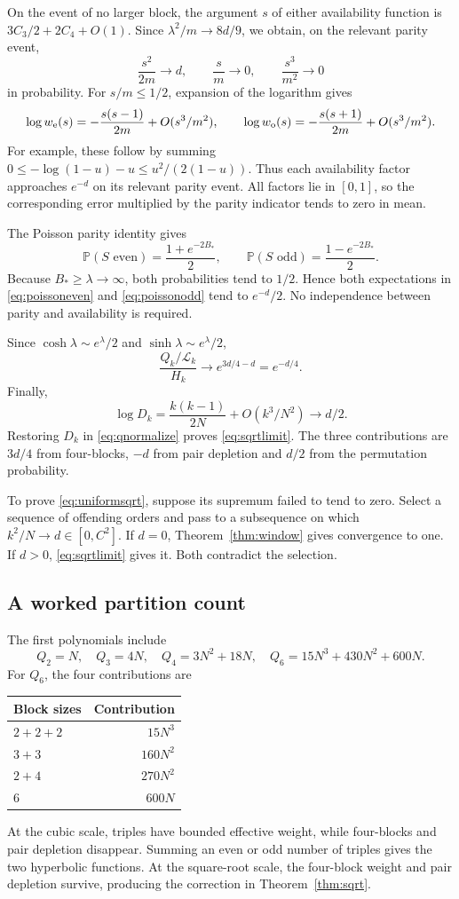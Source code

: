 \documentclass[11pt]{article}
\theoremstyle{definition}
\theoremstyle{remark}
\newcommand{\PP}{\mathbb P}
\newcommand{\1}{\mathbf 1}
\begin{document}
On the event of no larger block, the argument $s$ of either availability function is $3C_3/2+2C_4+O(1)$. Since $\lambda^2/m\to8d/9$, we obtain, on the relevant parity event,
\[
\frac{s^2}{2m}\to d,\qquad \frac sm\to0,\qquad \frac{s^3}{m^2}\to0
\]
in probability. For $s/m\le1/2$, expansion of the logarithm gives
\[
\log w_{\rm e}(s)=-\frac{s(s-1)}{2m}+O(s^3/m^2),\qquad
\log w_{\rm o}(s)=-\frac{s(s+1)}{2m}+O(s^3/m^2).
\]
For example, these follow by summing
$0\le-\log(1-u)-u\le u^2/(2(1-u))$.
Thus each availability factor approaches $e^{-d}$ on its relevant parity event. All factors lie in $[0,1]$, so the corresponding error multiplied by the parity indicator tends to zero in mean.

The Poisson parity identity gives
\[
\PP(S\text{ even})=\frac{1+e^{-2B_*}}2,\qquad
\PP(S\text{ odd})=\frac{1-e^{-2B_*}}2.
\]
Because $B_*\ge\lambda\to\infty$, both probabilities tend to $1/2$. Hence both expectations in \eqref{eq:poissoneven} and \eqref{eq:poissonodd} tend to $e^{-d}/2$. No independence between parity and availability is required.

Since $\cosh\lambda\sim e^\lambda/2$ and $\sinh\lambda\sim e^\lambda/2$,
\[
\frac{Q_k/\mathcal L_k}{H_k}\longrightarrow e^{3d/4-d}=e^{-d/4}.
\]
Finally,
\[
\log D_k=\frac{k(k-1)}{2N}+O(k^3/N^2)\longrightarrow d/2.
\]
Restoring $D_k$ in \eqref{eq:qnormalize} proves \eqref{eq:sqrtlimit}. The three contributions are $3d/4$ from four-blocks, $-d$ from pair depletion and $d/2$ from the permutation probability.

To prove \eqref{eq:uniformsqrt}, suppose its supremum failed to tend to zero. Select a sequence of offending orders and pass to a subsequence on which $k^2/N\to d\in[0,C^2]$. If $d=0$, Theorem~\ref{thm:window} gives convergence to one. If $d>0$, \eqref{eq:sqrtlimit} gives it. Both contradict the selection.

\subsection{A worked partition count}

The first polynomials include
\[
Q_2=N,\quad Q_3=4N,\quad Q_4=3N^2+18N,\quad
Q_6=15N^3+430N^2+600N.
\]
For $Q_6$, the four contributions are
\begin{center}
\begin{tabular}{lr}
\toprule
Block sizes & Contribution\\
\midrule
$2+2+2$ & $15N^3$\\
$3+3$ & $160N^2$\\
$2+4$ & $270N^2$\\
$6$ & $600N$\\
\bottomrule
\end{tabular}
\end{center}
At the cubic scale, triples have bounded effective weight, while four-blocks and pair depletion disappear. Summing an even or odd number of triples gives the two hyperbolic functions. At the square-root scale, the four-block weight and pair depletion survive, producing the correction in Theorem~\ref{thm:sqrt}.
\end{document}
